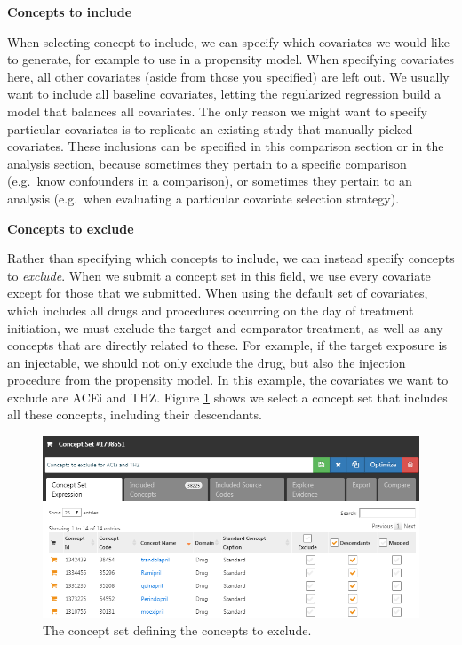 \documentclass[11pt]{book}
\theoremstyle{definition}
\theoremstyle{definition}
\theoremstyle{definition}
\theoremstyle{remark}
\begin{document}
\textbf{Concepts to include}

When selecting concept to include, we can specify which covariates we would like to generate, for example to use in a propensity model. When specifying covariates here, all other covariates (aside from those you specified) are left out. We usually want to include all baseline covariates, letting the regularized regression build a model that balances all covariates. The only reason we might want to specify particular covariates is to replicate an existing study that manually picked covariates. These inclusions can be specified in this comparison section or in the analysis section, because sometimes they pertain to a specific comparison (e.g.~know confounders in a comparison), or sometimes they pertain to an analysis (e.g.~when evaluating a particular covariate selection strategy).

\textbf{Concepts to exclude}

Rather than specifying which concepts to include, we can instead specify concepts to \emph{exclude}. When we submit a concept set in this field, we use every covariate except for those that we submitted. When using the default set of covariates, which includes all drugs and procedures occurring on the day of treatment initiation, we must exclude the target and comparator treatment, as well as any concepts that are directly related to these. For example, if the target exposure is an injectable, we should not only exclude the drug, but also the injection procedure from the propensity model. In this example, the covariates we want to exclude are ACEi and THZ. Figure \ref{fig:covsToExclude} shows we select a concept set that includes all these concepts, including their descendants.

\begin{figure}

{\centering \includegraphics[width=1\linewidth]{images/PopulationLevelEstimation/covsToExclude} 

}

\caption{The concept set defining the concepts to exclude.}\label{fig:covsToExclude}
\end{figure}
\end{document}
